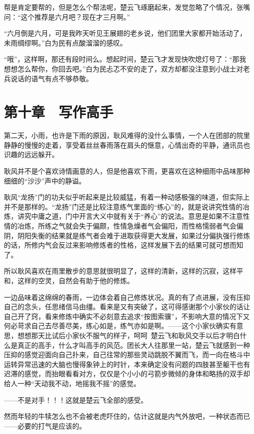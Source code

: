 帮是肯定要帮的，但是怎么个帮法呢，楚云飞琢磨起来，发觉忽略了个情况，张嘴问：“这个推荐是六月吧？现在才三月啊。”

“六月倒是六月，可是我昨天听见王展翅的老乡说，他们团里大家都开始活动了，未雨绸缪啊。”白为民有点酸溜溜的感叹。

“哦”，这样啊，那还有段时间么。想起时间，楚云飞才发现快吹熄灯号了：“那我想想怎么帮你，你回去吧。”白为民忐忑不安的走了，双方却都没注意到小战士对老兵说话的语气有点不够恭敬。

\section{第十章　写作高手}

第二天，小雨，也许是下雨的原因，耿风难得的没什么事情，一个人在团部的院里静静的慢慢的走着，享受着丝丝春雨落在肩头的惬意，心情出奇的平静，通讯员也识趣的远远躲开。

耿风并不是个喜欢诗情画意的人，但是他喜欢下雨，更喜欢在这种细雨中品味那种细细的“沙沙”声中的静谥。

耿风“龙扬”门的功夫似乎听起来是比较威猛，有着一种动感极强的味道，但实际上并不是那样的。“龙扬”门还是比较注意练气里面的“练心”的，就是说讲究性情的冶炼，讲究中庸之道，门中开言大义中就有关于“养心”的说法。意思是如果不注意性情的冶炼，所练之气就会失于偏颇，性情急燥者气会偏阳，而性格懦弱者气会偏阴，阴阳失衡的结果就是练气者会难于进取获得更大发展，如果过分偏执强行修炼的话，所修内气会反过来影响修炼者的性格，这样发展下去的结果可就可想而知了。

所以耿风喜欢在雨里散步的意思就很明显了，这样的清新，这样的沉寂，这样平和，这样的空灵，自然会有助于他的修炼。

一边品味着这绵绵的春雨，一边体会着自己修炼状况。真的有了点进展，没有压抑自己的念头，任思绪信马由缰。看来是又有突破了，这可得感谢那个小家伙的话让自己开了窍，看来修炼中确实不必刻意去追求“按图索骥”，不影响大意的情况下又何必苛求自己去尽善尽美，练心如是，练气亦如是啊。——这个小家伙确实有意思，想想那天比试后小家伙不服气的样子，呵呵~楚云飞和耿风交手以后才明白什么是真正的高手，什么才叫高手的风范。团长大人往那里一站，楚云飞就感到一种压抑的感觉迎面向自己扑来，自己往常的那些灵动跳脱不翼而飞，而一向在格斗中运转异常迅速的大脑也慢得象钟上的时针，本来确定没有问题的四肢甚至躯干也有迟滞的感觉，而抬眼看看对方，仅仅是个小小的弓箭步微倾的身体和略扬的双手却给人一种“天动我不动，地摇我不摇”的感觉。

——不是对手！！！这就是楚云飞全部的感受。

然而年轻的牛犊怎么也不会被老虎吓住的，估计这就是内气外放吧，一种状态而已——必要的打气是应该的。

